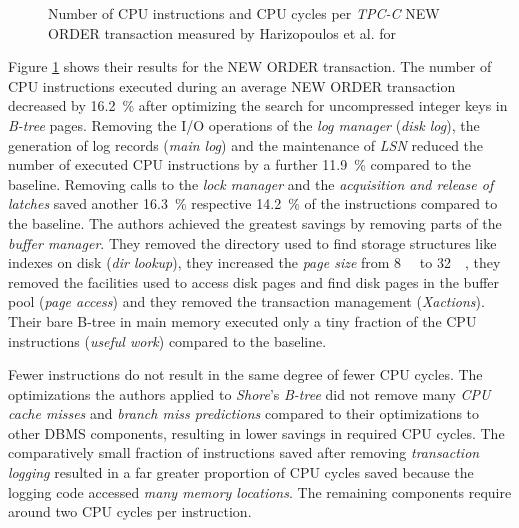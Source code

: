 \begin{@empty}
\begin{figure}
        \caption[Results from \cite{Harizopoulos:2008}]{Number of CPU instructions and CPU cycles per \textit{TPC-C} NEW ORDER transaction measured by Harizopoulos et al. for \cite{Harizopoulos:2008}}
        \label{fig:lookingglassneworder}
    \end{figure}
\end{@empty}

    Figure \ref{fig:lookingglassneworder} shows their results for the NEW ORDER transaction. The number of CPU instructions executed during an average NEW ORDER transaction decreased by \SI{16.2}{\percent} after optimizing the search for uncompressed integer keys in \emph{B-tree} pages. Removing the I/O operations of the \emph{log manager} (\emph{disk log}), the generation of log records (\emph{main log}) and the maintenance of \emph{LSN} reduced the number of executed CPU instructions by a further \SI{11.9}{\percent} compared to the baseline. Removing calls to the \emph{lock manager} and the \emph{acquisition and release of latches} saved another \SI{16.3}{\percent} respective \SI{14.2}{\percent} of the instructions compared to the baseline. The authors achieved the greatest savings by removing parts of the \emph{buffer manager}. They removed the directory used to find storage structures like indexes on disk (\emph{dir lookup}), they increased the \emph{page size} from \SI{8}{\kilo\byte} to \SI{32}{\kilo\byte}, they removed the facilities used to access disk pages and find disk pages in the buffer pool (\emph{page access}) and they removed the transaction management (\emph{Xactions}). Their bare B-tree in main memory executed only a tiny fraction of the CPU instructions (\emph{useful work}) compared to the baseline.

    Fewer instructions do not result in the same degree of fewer CPU cycles. The optimizations the authors applied to \textit{Shore}'s \emph{B-tree} did not remove many \emph{CPU cache misses} and \emph{branch miss predictions} compared to their optimizations to other DBMS components, resulting in lower savings in required CPU cycles. The comparatively small fraction of instructions saved after removing \emph{transaction logging} resulted in a far greater proportion of CPU cycles saved because the logging code accessed \emph{many memory locations}. The remaining components require around two CPU cycles per instruction.

